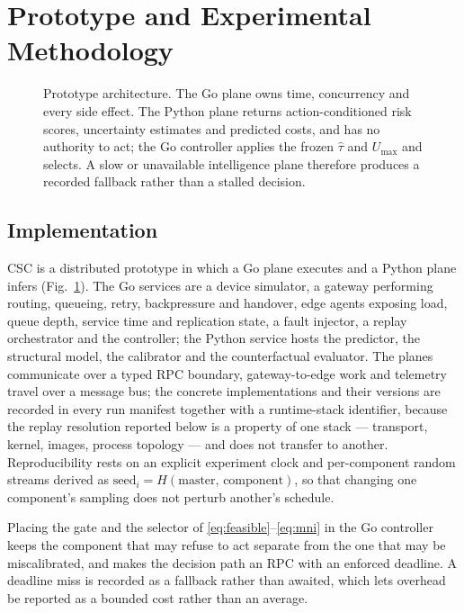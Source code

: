 \documentclass[journal]{IEEEtran}
\newcommand{\Umax}{U_{\max}}
\begin{document}
\section{Prototype and Experimental Methodology}
\label{sec:method}

\begin{figure}[!t]
\centering

\caption{Prototype architecture. The Go plane owns time, concurrency and every
side effect. The Python plane returns action-conditioned risk scores,
uncertainty estimates and predicted costs, and has no authority to act; the Go
controller applies the frozen $\hat\tau$ and $\Umax$ and selects. A slow or
unavailable intelligence plane therefore produces a recorded fallback rather
than a stalled decision.}
\label{fig:arch}
\end{figure}

\subsection{Implementation}
CSC is a distributed prototype in which a Go plane executes and a Python plane
infers (Fig.~\ref{fig:arch}). The Go services are a device simulator, a gateway
performing routing, queueing, retry, backpressure and handover, edge agents
exposing load, queue depth, service time and replication state, a fault
injector, a replay orchestrator and the controller; the Python service hosts the
predictor, the structural model, the calibrator and the counterfactual
evaluator. The planes communicate over a typed RPC boundary, gateway-to-edge
work and telemetry travel over a message bus; the concrete implementations and
their versions are recorded in every run manifest together with a runtime-stack
identifier, because the replay resolution reported below is a property of one
stack --- transport, kernel, images, process topology --- and does not transfer
to another. Reproducibility rests on an explicit experiment clock
and per-component random streams derived as
$\mathrm{seed}_i=H(\mathrm{master},\,\mathrm{component})$, so that changing one
component's sampling does not perturb another's schedule.

Placing the gate and the selector of \eqref{eq:feasible}--\eqref{eq:mni} in the
Go controller keeps the component that may refuse to act separate from the one
that may be miscalibrated, and makes the decision path an RPC with an enforced
deadline. A deadline miss is recorded as a fallback rather than awaited, which
lets overhead be reported as a bounded cost rather than an average.
\end{document}
